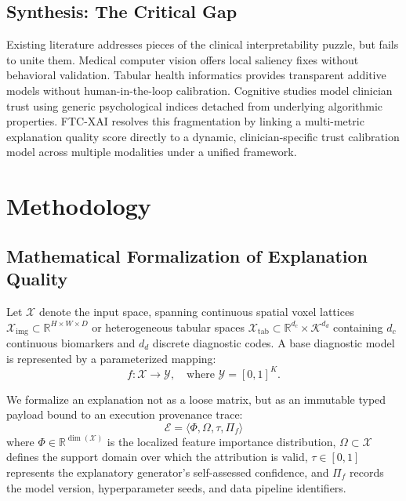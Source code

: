 \documentclass[10pt,journal,compsoc]{IEEEtran}
\begin{document}
\subsection{Synthesis: The Critical Gap}
Existing literature addresses pieces of the clinical interpretability puzzle, but fails to unite them. Medical computer vision offers local saliency fixes without behavioral validation. Tabular health informatics provides transparent additive models without human-in-the-loop calibration. Cognitive studies model clinician trust using generic psychological indices detached from underlying algorithmic properties. FTC-XAI resolves this fragmentation by linking a multi-metric explanation quality score directly to a dynamic, clinician-specific trust calibration model across multiple modalities under a unified framework.

\section{Methodology}

\subsection{Mathematical Formalization of Explanation Quality}
Let $\mathcal{X}$ denote the input space, spanning continuous spatial voxel lattices $\mathcal{X}_{\text{img}} \subset \mathbb{R}^{H \times W \times D}$ or heterogeneous tabular spaces $\mathcal{X}_{\text{tab}} \subset \mathbb{R}^{d_c} \times \mathcal{K}^{d_d}$ containing $d_c$ continuous biomarkers and $d_d$ discrete diagnostic codes. A base diagnostic model is represented by a parameterized mapping:
\begin{equation}
f: \mathcal{X} \rightarrow \mathcal{Y}, \quad \text{where } \mathcal{Y} = [0, 1]^K.
\end{equation}

We formalize an explanation not as a loose matrix, but as an immutable typed payload bound to an execution provenance trace:
\begin{equation}
\mathcal{E} = \langle \Phi, \Omega, \tau, \Pi_f \rangle
\end{equation}
where $\Phi \in \mathbb{R}^{\dim(\mathcal{X})}$ is the localized feature importance distribution, $\Omega \subset \mathcal{X}$ defines the support domain over which the attribution is valid, $\tau \in [0, 1]$ represents the explanatory generator's self-assessed confidence, and $\Pi_f$ records the model version, hyperparameter seeds, and data pipeline identifiers.
\end{document}
